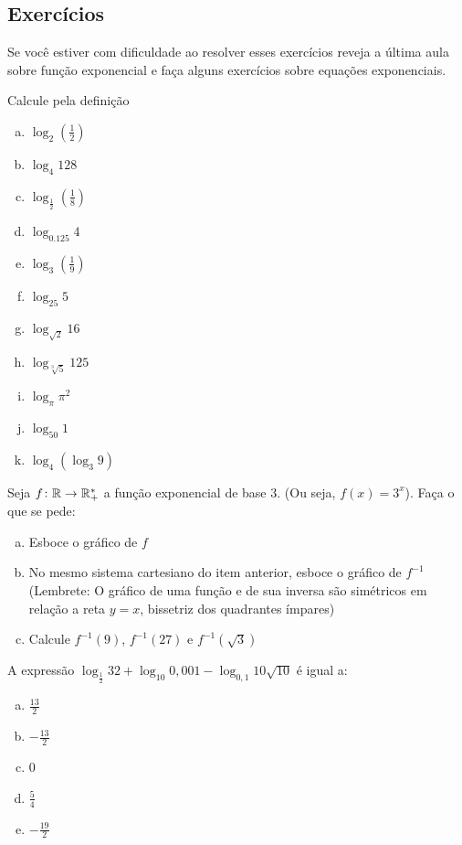 \subsection*{Exercícios}
Se você estiver com dificuldade ao resolver esses exercícios reveja a última aula sobre função exponencial e faça alguns exercícios sobre equações exponenciais.
\begin{exer}Calcule pela definição
\begin{enumerate}[a)]
\item $\log_2{(\frac{1}{2})}$
\item $\log_4{128}$
\item $\log_{\frac{1}{2}}{(\frac{1}{8})}$
\item $\log_{0.125}{4}$
\item $\log_3{(\frac{1}{9})}$
\item $\log_{25}{5}$
\item $\log_{\sqrt{2}}{16}$
\item $\log_{\sqrt[3]{5}}{125}$
\item $\log_{\pi}{\pi^2}$
\item $\log_{50}{1}$
\item $\log_4{(\log_3{9})}$
\end{enumerate}
\end{exer}

\begin{exer} Seja $f \colon \mathbb{R} \to \mathbb{R}_+^*$ a função exponencial de base $3$. (Ou seja, $f(x)=3^x$). Faça o que se pede:
\begin{enumerate}[a)]
\item Esboce o gráfico de $f$
\item No mesmo sistema cartesiano do item anterior, esboce o gráfico de $f^{-1}$ (Lembrete: O gráfico de uma função e de sua inversa são simétricos em relação a reta $y=x$, bissetriz dos quadrantes ímpares)
\item Calcule $f^{-1}(9)$, $f^{-1}(27)$ e $f^{-1}(\sqrt{3})$
\end{enumerate}
\end{exer}

\begin{exer}[MACKENZIE] A expressão $\log_{\frac{1}{2}}32 + \log_{10}0,001-\log_{0,1}10\sqrt{10}$ é igual a:
\begin{enumerate}[a)]
\item $\frac{13}{2}$
\item $-\frac{13}{2}$
\item $0$
\item $\frac{5}{4}$
\item $-\frac{19}{2}$
\end{enumerate}
\end{exer}

